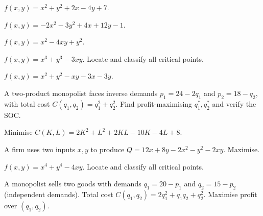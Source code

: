 \begin{problems}
    \item $f(x, y) = x^2 + y^2 + 2 x - 4 y + 7$.
    \item $f(x, y) = -2 x^2 - 3 y^2 + 4 x + 12 y - 1$.
    \item $f(x, y) = x^2 - 4 x y + y^2$.
    \item $f(x, y) = x^3 + y^3 - 3 x y$. Locate and classify all critical points.
    \item $f(x, y) = x^2 + y^2 - x y - 3 x - 3 y$.
    \item A two-product monopolist faces inverse demands $p_1 = 24 - 2 q_1$ and $p_2 = 18 - q_2$, with total cost $C(q_1, q_2) = q_1^2 + q_2^2$. Find profit-maximising $q_1^*, q_2^*$ and verify the SOC.
    \item Minimise $C(K, L) = 2 K^2 + L^2 + 2 K L - 10 K - 4 L + 8$.
    \item A firm uses two inputs $x, y$ to produce $Q = 12 x + 8 y - 2 x^2 - y^2 - 2 x y$. Maximise.
    \item $f(x, y) = x^4 + y^4 - 4 x y$. Locate and classify all critical points.
    \item A monopolist sells two goods with demands $q_1 = 20 - p_1$ and $q_2 = 15 - p_2$ (independent demands). Total cost $C(q_1, q_2) = 2 q_1^2 + q_1 q_2 + q_2^2$. Maximise profit over $(q_1, q_2)$.


\end{problems}
